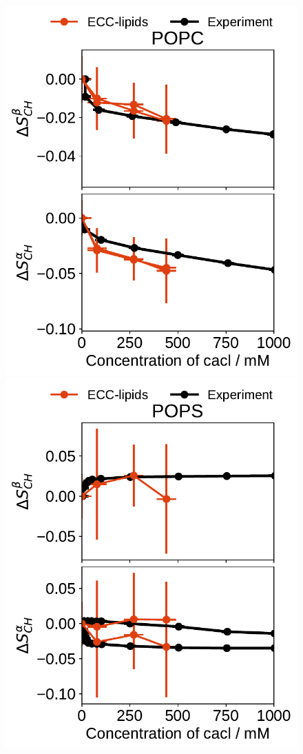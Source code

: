 \documentclass[journal=jpcbfk,manuscript=article]{achemso}
\newlength{\figwidth}
\begin{document}
\begin{figure}[htb!] 
  \centering 
  \includegraphics[width=\figwidth]{../Fig/order_parameters_changes_A-B_POPC_cacl.pdf} 
  \includegraphics[width=\figwidth]{../Fig/order_parameters_changes_A-B_POPS_cacl.pdf} 

\end{figure}
\end{document}
